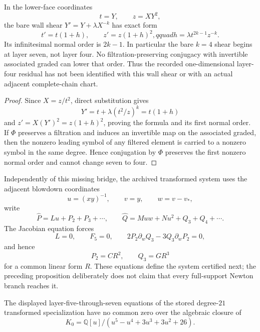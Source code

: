 \begin{proposition}
\label{prop:k4-chart-transition}
In the lower-face coordinates
\[
t=Y,\qquad z=XY^2,
\]
the bare wall shear \(Y'=Y+\lambda X^{-k}\) has exact form
\[
t'=t(1+h),\qquad z'=z(1+h)^2,qquad
h=\lambda t^{2k-1}z^{-k}.
\]
Its infinitesimal normal order is \(2k-1\).  In particular the bare
\(k=4\) shear begins at layer seven, not layer four.  No
filtration-preserving conjugacy with invertible associated graded can lower
that order.  Thus the recorded one-dimensional layer-four residual has not
been identified with this wall shear or with an actual adjacent
complete-chain chart.
\end{proposition}

\begin{proof}
Since \(X=z/t^2\), direct substitution gives
\[
Y'=t+\lambda(t^2/z)^k=t(1+h)
\]
and \(z'=X(Y')^2=z(1+h)^2\), proving the formula and its first normal order.
If \(\Phi\) preserves a filtration and induces an invertible map on the
associated graded, then the nonzero leading symbol of any filtered element
is carried to a nonzero symbol in the same degree.  Hence conjugation by
\(\Phi\) preserves the first nonzero normal order and cannot change seven
to four.
\end{proof}

Independently of this missing bridge, the archived transformed system uses
the adjacent blowdown coordinates
\[
u=(xy)^{-1},\qquad v=y,\qquad w=v-v_*,
\]
write
\[
\widehat P=Lu+P_2+P_3+\cdots,\qquad
\widehat Q=Muw+Nu^2+Q_3+Q_4+\cdots.
\]
The Jacobian equation forces
\[
L=0,\qquad F_5=0,\qquad
2P_2\partial_wQ_3-3Q_3\partial_wP_2=0,
\]
and hence
\[
P_2=CR^2,\qquad Q_3=GR^3
\]
for a common linear form \(R\).  These equations define the system certified
next; the preceding proposition deliberately does not claim that every
full-support Newton branch reaches it.

\begin{theorem}
\label{thm:stored-terminal-layer-seven}
The displayed layer-five-through-seven equations of the stored
degree-\(21\) transformed specialization have no common zero over the
algebraic closure of
\[
K_0=\mathbb Q[u]/(u^5-u^4+3u^3+3u^2+26).
\]
\end{theorem}

